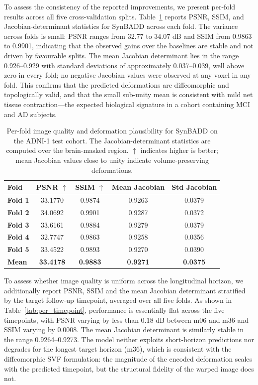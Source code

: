 To assess the consistency of the reported improvements, we present per-fold results across all five cross-validation splits. Table~\ref{tab:perfold_main} reports PSNR, SSIM, and Jacobian-determinant statistics for SynBADD across each fold. The variance across folds is small: PSNR ranges from 32.77 to 34.07 dB and SSIM from 0.9863 to 0.9901, indicating that the observed gains over the baselines are stable and not driven by favourable splits. The mean Jacobian determinant lies in the range 0.926--0.929 with standard deviations of approximately 0.037--0.039, well above zero in every fold; no negative Jacobian values were observed at any voxel in any fold. This confirms that the predicted deformations are diffeomorphic and topologically valid, and that the small sub-unity mean is consistent with mild net tissue contraction---the expected biological signature in a cohort containing MCI and AD subjects.

\begin{table}[ht]
\centering
\caption{Per-fold image quality and deformation plausibility for SynBADD on the ADNI-1 test cohort. The Jacobian-determinant statistics are computed over the brain-masked region. $\uparrow$ indicates higher is better; mean Jacobian values close to unity indicate volume-preserving deformations.}
\begin{tabular}{>{\bfseries}lcccc}
\toprule
Fold & PSNR $\uparrow$ & SSIM $\uparrow$ & Mean Jacobian & Std Jacobian \\
\midrule
Fold 1 & 33.1770 & 0.9874 & 0.9263 & 0.0379 \\
Fold 2 & 34.0692 & 0.9901 & 0.9287 & 0.0372 \\
Fold 3 & 33.6161 & 0.9884 & 0.9279 & 0.0379 \\
Fold 4 & 32.7747 & 0.9863 & 0.9258 & 0.0356 \\
Fold 5 & 33.4522 & 0.9893 & 0.9270 & 0.0390 \\
\midrule
\textbf{Mean} & \textbf{33.4178} & \textbf{0.9883} & \textbf{0.9271} & \textbf{0.0375} \\
\bottomrule
\end{tabular}
\label{tab:perfold_main}
\end{table}

To assess whether image quality is uniform across the longitudinal horizon, we additionally report PSNR, SSIM and the mean Jacobian determinant stratified by the target follow-up timepoint, averaged over all five folds. As shown in Table~\ref{tab:per_timepoint}, performance is essentially flat across the five timepoints, with PSNR varying by less than 0.18 dB between m06 and m36 and SSIM varying by 0.0008. The mean Jacobian determinant is similarly stable in the range 0.9264--0.9273. The model neither exploits short-horizon predictions nor degrades for the longest target horizon (m36), which is consistent with the diffeomorphic SVF formulation: the magnitude of the encoded deformation scales with the predicted timepoint, but the structural fidelity of the warped image does not.

